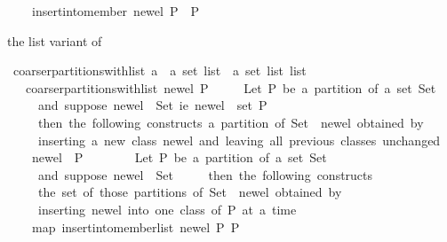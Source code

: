 \begin{isabellebody}
\ \ \ \ {\isacharparenleft}{\isacharparenleft}insert{\isacharunderscore}into{\isacharunderscore}member\ new{\isacharunderscore}el\ P{\isacharparenright}\ {\isacharbackquote}\ P{\isacharparenright}{\isachardoublequoteclose}%
\begin{isamarkuptext}%
the list variant of %
\end{isamarkuptext}%
\isamarkuptrue%
\isamarkupfalse%
\ coarser{\isacharunderscore}partitions{\isacharunderscore}with{\isacharunderscore}list\ {\isacharcolon}{\isacharcolon}{\isachardoublequoteopen}{\isacharprime}a\ {\isasymRightarrow}\ {\isacharprime}a\ set\ list\ {\isasymRightarrow}\ {\isacharprime}a\ set\ list\ list{\isachardoublequoteclose}\isanewline
\ \ \ {\isachardoublequoteopen}coarser{\isacharunderscore}partitions{\isacharunderscore}with{\isacharunderscore}list\ new{\isacharunderscore}el\ P\ {\isacharequal}\ \isanewline
\ \ {\isacharparenleft}{\isacharasterisk}\ Let\ P\ be\ a\ partition\ of\ a\ set\ Set{\isacharcomma}\isanewline
\ \ \ \ \ and\ suppose\ new{\isacharunderscore}el\ {\isasymnotin}\ Set{\isacharcomma}\ i{\isachardot}e{\isachardot}\ {\isacharbraceleft}new{\isacharunderscore}el{\isacharbraceright}\ {\isasymnotin}\ set\ P{\isacharcomma}\isanewline
\ \ \ \ \ then\ the\ following\ constructs\ a\ partition\ of\ {\isacharprime}Set\ {\isasymunion}\ {\isacharbraceleft}new{\isacharunderscore}el{\isacharbraceright}{\isacharprime}\ obtained\ by\isanewline
\ \ \ \ \ inserting\ a\ new\ class\ {\isacharbraceleft}new{\isacharunderscore}el{\isacharbraceright}\ and\ leaving\ all\ previous\ classes\ unchanged{\isachardot}\ {\isacharasterisk}{\isacharparenright}\isanewline
\ \ \ \ {\isacharparenleft}{\isacharbraceleft}new{\isacharunderscore}el{\isacharbraceright}\ {\isacharhash}\ P{\isacharparenright}\isanewline
\ \ \ \ {\isacharhash}\isanewline
\ \ {\isacharparenleft}{\isacharasterisk}\ Let\ P\ be\ a\ partition\ of\ a\ set\ Set{\isacharcomma}\isanewline
\ \ \ \ \ and\ suppose\ new{\isacharunderscore}el\ {\isasymnotin}\ Set{\isacharcomma}\isanewline
\ \ \ \ \ then\ the\ following\ constructs\isanewline
\ \ \ \ \ the\ set\ of\ those\ partitions\ of\ {\isacharprime}Set\ {\isasymunion}\ {\isacharbraceleft}new{\isacharunderscore}el{\isacharbraceright}{\isacharprime}\ obtained\ by\isanewline
\ \ \ \ \ inserting\ new{\isacharunderscore}el\ into\ one\ class\ of\ P\ at\ a\ time{\isachardot}\ {\isacharasterisk}{\isacharparenright}\isanewline
\ \ \ \ {\isacharparenleft}map\ {\isacharparenleft}{\isacharparenleft}insert{\isacharunderscore}into{\isacharunderscore}member{\isacharunderscore}list\ new{\isacharunderscore}el\ P{\isacharparenright}{\isacharparenright}\ P{\isacharparenright}{\isachardoublequoteclose}%

\end{isabellebody}
